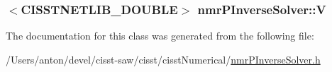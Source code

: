 \subsubsection[{V}]{$<$C\+I\+S\+S\+T\+N\+E\+T\+L\+I\+B\+\_\+\+D\+O\+U\+B\+L\+E$>$ nmr\+P\+Inverse\+Solver\+::\+V\hspace{0.3cm}{\ttfamily [protected]}}\label{classnmr_p_inverse_solver_af28274cc42c66aa6fd7b48b04b35d249}


The documentation for this class was generated from the following file\+:\begin{DoxyCompactItemize}
\item 
/\+Users/anton/devel/cisst-\/saw/cisst/cisst\+Numerical/\hyperlink{nmr_p_inverse_solver_8h}{nmr\+P\+Inverse\+Solver.\+h}\end{DoxyCompactItemize}
